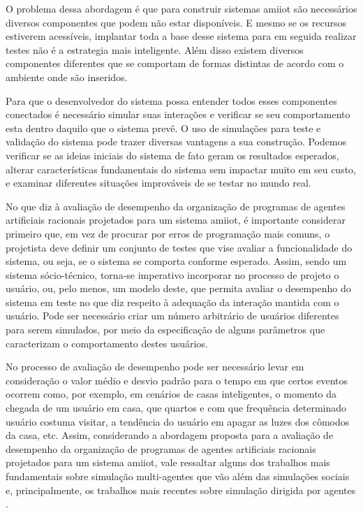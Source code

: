     O problema dessa abordagem é que para construir sistemas \acrshort{amiiot} são necessários diversos componentes que podem não estar disponíveis. E mesmo se os recursos estiverem acessíveis, implantar toda a base desse sistema para em seguida realizar testes não é a estrategia mais inteligente. Além disso existem diversos componentes diferentes que se comportam de formas distintas de acordo com o ambiente onde são inseridos. 
    
    Para que o desenvolvedor do sistema possa entender todos esses componentes conectados é necessário simular suas interações e verificar se seu comportamento esta dentro daquilo que o sistema  prevê.  O uso de simulações para teste e validação do sistema pode trazer diversas vantagens a sua construção. Podemos verificar se as ideias iniciais do sistema de fato geram os resultados esperados, alterar características fundamentais do sistema sem impactar muito em seu custo, e examinar diferentes situações improváveis de se testar no mundo real. 

    No que diz à avaliação de desempenho da organização de programas de agentes artificiais racionais projetados para um sistema \acrshort{amiiot}, é importante considerar primeiro que, em vez de procurar por erros de programação mais comuns, o projetista deve definir um conjunto de testes que vise avaliar a funcionalidade do sistema, ou seja, se o sistema se comporta conforme esperado. Assim, sendo um sistema sócio-técnico, torna-se imperativo incorporar no processo de projeto o usuário, ou, pelo menos, um modelo deste, que permita avaliar o desempenho do sistema em teste no que diz respeito à adequação da interação mantida com o usuário. Pode ser necessário criar um número arbitrário de usuários diferentes para serem simulados, por meio da especificação de alguns parâmetros que caracterizam o comportamento destes usuários.

    No processo de avaliação de desempenho pode ser necessário levar em consideração o valor médio e desvio padrão para o tempo em que certos eventos ocorrem como, por exemplo, em cenários de casas inteligentes, o momento da chegada de um usuário em casa, que quartos e com que frequência determinado usuário costuma visitar, a tendência do usuário em apagar as luzes dos cômodos da casa, etc. Assim, considerando a abordagem proposta para a avaliação de desempenho da organização de programas de agentes artificiais racionais projetados para um sistema \acrshort{amiiot}, vale ressaltar alguns dos trabalhos mais fundamentais sobre simulação multi-agentes que vão além das simulações sociais \cite{davidsson2000multi, garcia2010human} e, principalmente, os trabalhos mais recentes sobre simulação dirigida por agentes \cite{barry2009agent}.
    


